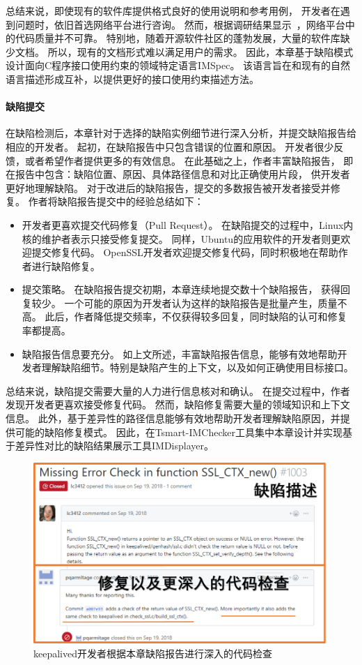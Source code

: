 总结来说，即使现有的软件库提供格式良好的使用说明和参考用例，
开发者在遇到问题时，依旧首选网络平台进行咨询。
然而，根据调研结果显示~\cite{18-icse-stack}，网络平台中的代码质量并不可靠。
特别地，随着开源软件社区的蓬勃发展，大量的软件库缺少文档。
所以，现有的文档形式难以满足用户的需求。
因此，本章基于缺陷模式设计面向C程序接口使用约束的领域特定语言IMSpec。
该语言旨在和现有的自然语言描述形成互补，以提供更好的接口使用约束描述方法。



\paragraph{缺陷提交}
在缺陷检测后，本章针对于选择的缺陷实例细节进行深入分析，并提交缺陷报告给相应的开发者。
起初，在缺陷报告中只包含错误的位置和原因。
开发者很少反馈，或者希望作者提供更多的有效信息。
在此基础之上，作者丰富缺陷报告，
即在报告中包含：缺陷位置、原因、具体路径信息和对比正确使用片段，
供开发者更好地理解缺陷。
对于改进后的缺陷报告，提交的多数报告被开发者接受并修复。
作者将缺陷报告提交中的经验总结如下：
\begin{itemize}
	\item 开发者更喜欢提交代码修复（Pull Request）。
	在缺陷提交的过程中，Linux内核的维护者表示只接受修复提交。
	同样，Ubuntu的应用软件的开发者则更欢迎提交修复代码。
	OpenSSL开发者欢迎提交修复代码，同时积极地在帮助作者进行缺陷修复。
	\item 提交策略。
	在缺陷报告提交初期，本章连续地提交数十个缺陷报告，
	获得回复较少。
	一个可能的原因为开发者认为这样的缺陷报告是批量产生，质量不高。
	此后，作者降低提交频率，不仅获得较多回复，同时缺陷的认可和修复率都提高。
	\item 缺陷报告信息要充分。
	如上文所述，丰富缺陷报告信息，能够有效地帮助开发者理解缺陷细节。特别是缺陷产生的上下文，以及如何正确使用目标接口。
\end{itemize}

总结来说，缺陷提交需要大量的人力进行信息核对和确认。
在提交过程中，作者发现开发者更喜欢接受修复代码。
然而，缺陷修复需要大量的领域知识和上下文信息。
此外，基于差异性的路径信息能够有效地帮助开发者理解缺陷原因，并提供可能的缺陷修复模式。
因此，在Tsmart-IMChecker工具集中本章设计并实现基于差异性对比的缺陷结果展示工具IMDisplayer。

\begin{figure}[b]
	\centering
	\includegraphics[width=0.8\linewidth]{figures/cp4-keepalived-fix.png}
	\caption{
		keepalived开发者根据本章缺陷报告进行深入的代码检查
	}
	\label{fig:4-4-keepalived-fix}
\end{figure}

